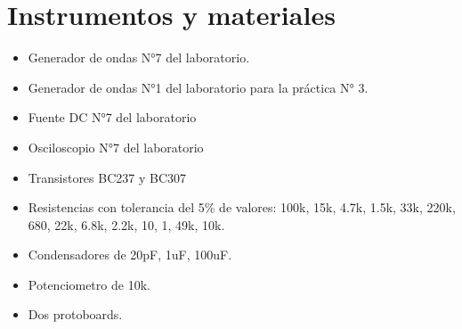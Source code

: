 \section{Instrumentos y materiales}

\begin{itemize}
    \item Generador de ondas N°7 del laboratorio.
    \item Generador de ondas N°1 del laboratorio para la práctica N° 3.
    \item Fuente DC N°7 del laboratorio
    \item Osciloscopio N°7 del laboratorio
    \item Transistores BC237 y BC307
    \item Resistencias con tolerancia del 5\% de valores: 100k, 15k, 4.7k, 1.5k, 33k, 220k, 680, 22k, 6.8k, 2.2k, 10, 1, 49k, 10k.
    \item Condensadores de 20pF, 1uF, 100uF.
    \item Potenciometro de 10k.
    \item Dos protoboards.
\end{itemize}